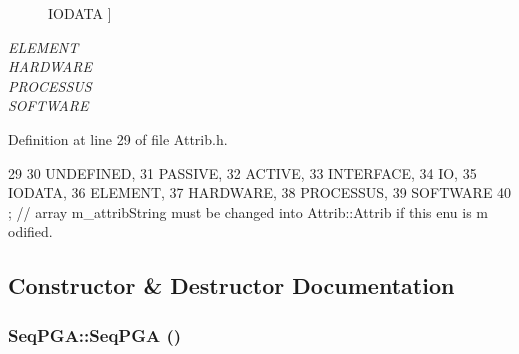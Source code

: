 \begin{Desc}
\begin{description}
{\hypertarget{classAttrib_a69e171d7cc6417835a5a306d3c764235a0af3b0d0ac323c1704e6c69cf90add28}{
IODATA}
\label{classAttrib_a69e171d7cc6417835a5a306d3c764235a0af3b0d0ac323c1704e6c69cf90add28}
}]\item[{\em 
\hypertarget{classAttrib_a69e171d7cc6417835a5a306d3c764235a7788bc5dd333fd8ce18562b269c9dab1}{
ELEMENT}
\label{classAttrib_a69e171d7cc6417835a5a306d3c764235a7788bc5dd333fd8ce18562b269c9dab1}
}]\item[{\em 
\hypertarget{classAttrib_a69e171d7cc6417835a5a306d3c764235a61ceb22149f365f1780d18f9d1459423}{
HARDWARE}
\label{classAttrib_a69e171d7cc6417835a5a306d3c764235a61ceb22149f365f1780d18f9d1459423}
}]\item[{\em 
\hypertarget{classAttrib_a69e171d7cc6417835a5a306d3c764235a75250e29692496e73effca2c0330977f}{
PROCESSUS}
\label{classAttrib_a69e171d7cc6417835a5a306d3c764235a75250e29692496e73effca2c0330977f}
}]\item[{\em 
\hypertarget{classAttrib_a69e171d7cc6417835a5a306d3c764235a103a67cd0b8f07ef478fa45d4356e27b}{
SOFTWARE}
\label{classAttrib_a69e171d7cc6417835a5a306d3c764235a103a67cd0b8f07ef478fa45d4356e27b}
}]\end{description}
\end{Desc}



Definition at line 29 of file Attrib.h.


\begin{DoxyCode}
29                 {
30     UNDEFINED,
31     PASSIVE,
32     ACTIVE,
33     INTERFACE,
34     IO,
35     IODATA,
36     ELEMENT,
37     HARDWARE,
38     PROCESSUS,
39     SOFTWARE 
40   }; // array m_attribString must be changed into Attrib::Attrib if this enu is m
      odified. 
\end{DoxyCode}


\subsection{Constructor \& Destructor Documentation}
\hypertarget{classSeqPGA_a032240de5048a496dcce57ac28e10f65}{
\subsubsection[{SeqPGA}]{\setlength{\rightskip}{0pt plus 5cm}SeqPGA::SeqPGA ()}}
\label{classSeqPGA_a032240de5048a496dcce57ac28e10f65}


